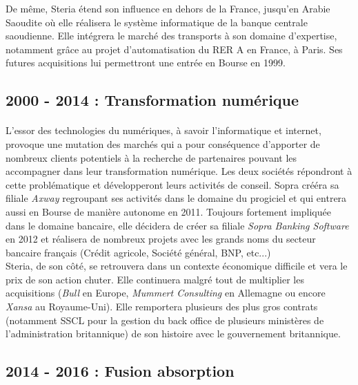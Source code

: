 De même, Steria étend son influence en dehors de la France, jusqu'en Arabie Saoudite où elle réalisera le système informatique de la banque centrale saoudienne. Elle intégrera le marché des transports à son domaine d'expertise, notamment grâce au projet d'automatisation du RER A en France, à Paris. Ses futures acquisitions lui permettront une entrée en Bourse en 1999.\\

\subsection{2000 - 2014 : Transformation numérique}

\paragraph{}
L'essor des technologies du numériques, à savoir l'informatique et internet, provoque une mutation des marchés qui a pour conséquence d'apporter de nombreux clients potentiels à la recherche de partenaires pouvant les accompagner dans leur transformation numérique. Les deux sociétés répondront à cette problématique et développeront leurs activités de conseil. Sopra crééra sa filiale \textit{Axway} regroupant ses activités dans le domaine du progiciel et qui entrera aussi en Bourse de manière autonome en 2011. Toujours fortement impliquée dans le domaine bancaire, elle décidera de créer sa filiale \textit{Sopra Banking Software} en 2012 et réalisera de nombreux projets avec les grands noms du secteur bancaire français (Crédit agricole, Société général, BNP, etc...)\\

Steria, de son côté, se retrouvera dans un contexte économique difficile et vera le prix de son action chuter. Elle continuera malgré tout de multiplier les acquisitions (\textit{Bull} en Europe, \textit{Mummert Consulting} en Allemagne ou encore \textit{Xansa} au Royaume-Uni). Elle remportera plusieurs des plus gros contrats (notamment SSCL pour la gestion du back office de plusieurs ministères de l'administration britannique) de son histoire avec le gouvernement britannique.

\subsection{2014 - 2016 : Fusion absorption}

\paragraph{}

